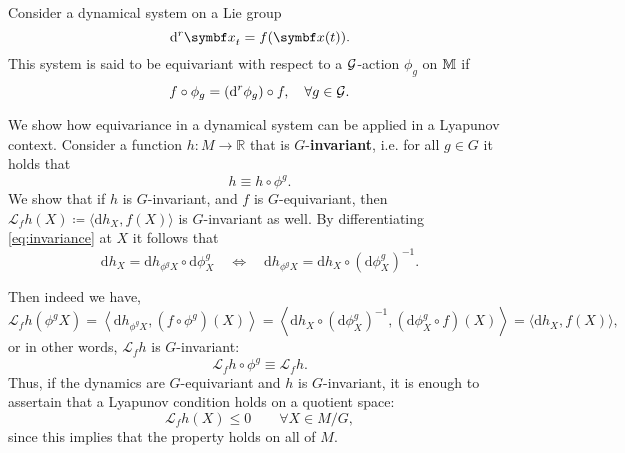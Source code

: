 \begin{definition}
  Consider a dynamical system on a Lie group
  \begin{equation}
    \mathrm{d}^r \x_t = f(\x(t)).
  \end{equation}
  This system is said to be equivariant with respect to a $\mathcal{G}$-action $\phi_g$ on ${\mathbb{M}}$ if
  \begin{equation}
    f \circ \phi_g = (\mathrm{d}^r \phi_g) \circ f, \quad \forall g \in \mathcal{G}.
  \end{equation}
\end{definition}


We show how equivariance in a dynamical system can be applied in a Lyapunov context. Consider a function $h : M \rightarrow \mathbb{R}$ that is $G$-\textbf{invariant}, i.e. for all $g \in G$ it holds that
\begin{equation}
\label{eq:invariance}
  h \equiv h \circ \phi^g.
\end{equation}
We show that if $h$ is $G$-invariant, and $f$ is $G$-equivariant, then $\mathcal L_f h(X) \coloneq \langle \mathrm{d} h_{X}, f(X) \rangle$ is $G$-invariant as well. By differentiating \eqref{eq:invariance} at $X$ it follows that
\begin{equation}
  \mathrm{d} h_X = \mathrm{d} h_{\phi^g X} \circ \mathrm{d} \phi^g_{X} \quad \Leftrightarrow \quad \mathrm{d} h_{\phi^g X} = \mathrm{d} h_X \circ \left(\mathrm{d} \phi_X^g \right)^{-1}.
\end{equation}

Then indeed we have,
\begin{equation}
  \mathcal L_f h (\phi^g X) = \left \langle \mathrm{d} h_{\phi^g X}, (f \circ \phi^g) (X)\right \rangle = \left \langle \mathrm{d} h_X \circ (\mathrm{d} \phi_X^{g})^{-1} , (\mathrm{d} \phi^g_X \circ f)(X) \right \rangle = \langle \mathrm{d} h_X, f(X) \rangle,
\end{equation}
or in other words, $\mathcal L_f h$ is $G$-invariant:
\begin{equation}
  \mathcal L_f h \circ \phi^g  \equiv   \mathcal L_f h.
\end{equation}
Thus, if the dynamics are $G$-equivariant and $h$ is $G$-invariant, it is enough to assertain that a Lyapunov condition holds on a quotient space:
\begin{equation}
  \mathcal L_f h(X) \leq 0 \qquad \forall X \in M / G,
\end{equation}
since this implies that the property holds on all of $M$.


